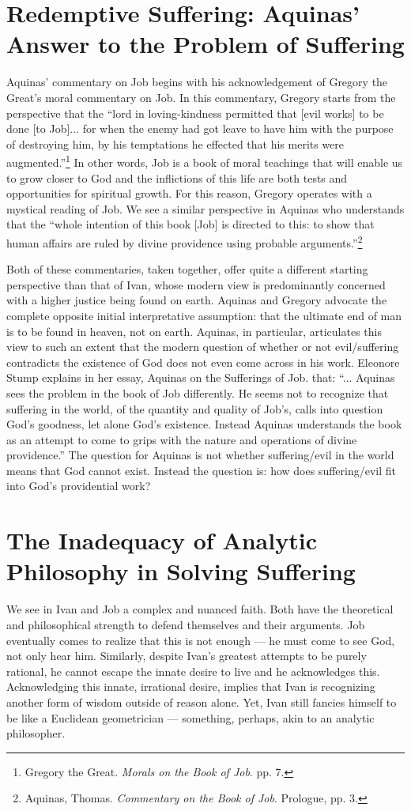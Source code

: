 \section{Redemptive Suffering: Aquinas' Answer to the Problem of Suffering}
Aquinas' commentary on Job begins with his acknowledgement of Gregory the Great's moral commentary on Job. In this commentary, Gregory starts from the perspective that the ``lord in loving-kindness permitted that [evil works] to be done [to Job]... for when the enemy had got leave to have him with the purpose of destroying him, by his temptations he effected that his merits were augmented.''\footnote{Gregory the Great. \emph{Morals on the Book of Job}. pp. 7.} In other words, Job is a book of moral teachings that will enable us to grow closer to God and the inflictions of this life are both tests and opportunities for spiritual growth. For this reason, Gregory operates with a mystical reading of Job. We see a similar perspective in Aquinas who understands that the ``whole intention of this book [Job] is directed to this: to show that human affairs are ruled by divine providence using probable arguments.''\footnote{Aquinas, Thomas. \emph{Commentary on the Book of Job}. Prologue, pp. 3.}

Both of these commentaries, taken together, offer quite a different starting perspective than that of Ivan, whose modern view is predominantly concerned with a higher justice being found on earth. Aquinas and Gregory advocate the complete opposite initial interpretative assumption: that the ultimate end of man is to be found in heaven, not on earth. Aquinas, in particular, articulates this view to such an extent that the modern question of whether or not evil/suffering contradicts the existence of God does not even come across in his work. Eleonore Stump explains in her essay, Aquinas on the Sufferings of Job. that: ``... Aquinas sees the problem in the book of Job differently. He seems not to recognize that suffering in the world, of the quantity and quality of Job's, calls into question God's goodness, let alone God's existence. Instead Aquinas understands the book as an attempt to come to grips with the nature and operations of divine providence.'' The question for Aquinas is not whether suffering/evil in the world means that God cannot exist. Instead the question is: how does suffering/evil fit into God's providential work? 

\section{The Inadequacy of Analytic Philosophy in Solving Suffering}
We see in Ivan and Job a complex and nuanced faith. Both have the theoretical and philosophical strength to defend themselves and their arguments. Job eventually comes to realize that this is not enough --- he must come to see God, not only hear him. Similarly, despite Ivan's greatest attempts to be purely rational, he cannot escape the innate desire to live and he acknowledges this. Acknowledging this innate, irrational desire, implies that Ivan is recognizing another form of wisdom outside of reason alone. Yet, Ivan still fancies himself to be like a Euclidean geometrician --- something, perhaps, akin to an analytic philosopher.

